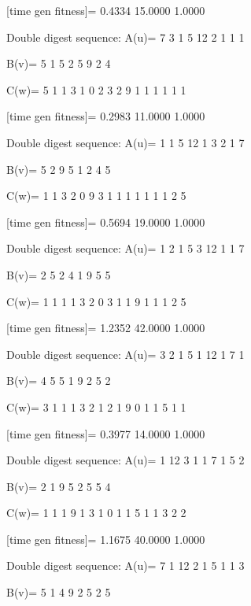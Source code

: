 [time gen fitness]=
    0.4334   15.0000    1.0000

Double digest sequence:
A(u)=
     7     3     1     5    12     2     1     1     1

B(v)=
     5     1     5     2     5     9     2     4

C(w)=
     5     1     1     3     1     0     2     3     2     9     1     1     1     1     1     1

[time gen fitness]=
    0.2983   11.0000    1.0000

Double digest sequence:
A(u)=
     1     1     5    12     1     3     2     1     7

B(v)=
     5     2     9     5     1     2     4     5

C(w)=
     1     1     3     2     0     9     3     1     1     1     1     1     1     1     2     5

[time gen fitness]=
    0.5694   19.0000    1.0000

Double digest sequence:
A(u)=
     1     2     1     5     3    12     1     1     7

B(v)=
     2     5     2     4     1     9     5     5

C(w)=
     1     1     1     1     3     2     0     3     1     1     9     1     1     1     2     5

[time gen fitness]=
    1.2352   42.0000    1.0000

Double digest sequence:
A(u)=
     3     2     1     5     1    12     1     7     1

B(v)=
     4     5     5     1     9     2     5     2

C(w)=
     3     1     1     1     3     2     1     2     1     9     0     1     1     5     1     1

[time gen fitness]=
    0.3977   14.0000    1.0000

Double digest sequence:
A(u)=
     1    12     3     1     1     7     1     5     2

B(v)=
     2     1     9     5     2     5     5     4

C(w)=
     1     1     1     9     1     3     1     0     1     1     5     1     1     3     2     2

[time gen fitness]=
    1.1675   40.0000    1.0000

Double digest sequence:
A(u)=
     7     1    12     2     1     5     1     1     3

B(v)=
     5     1     4     9     2     5     2     5

